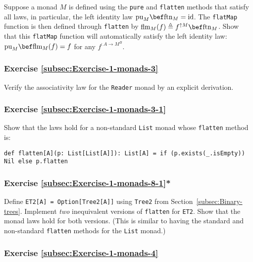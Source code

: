 Suppose a monad $M$ is defined using the \lstinline!pure! and \lstinline!flatten!
methods that satisfy all laws, in particular, the left identity law
$\text{pu}_{M}\bef\text{ftn}_{M}=\text{id}$. The \lstinline!flatMap!
function is then defined through \lstinline!flatten! by $\text{flm}_{M}(f)\triangleq f^{\uparrow M}\bef\text{ftn}_{M}$.
Show that this \lstinline!flatMap! function will automatically satisfy
the left identity law: $\text{pu}_{M}\bef\text{flm}_{M}(f)=f$ for
any $f^{:A\rightarrow M^{B}}$.

\subsubsection{Exercise \label{subsec:Exercise-1-monads-3}\ref{subsec:Exercise-1-monads-3}}

Verify the associativity law for the \lstinline!Reader! monad by
an explicit derivation.

\subsubsection{Exercise \label{subsec:Exercise-1-monads-3-1}\ref{subsec:Exercise-1-monads-3-1}}

Show that the laws hold for a non-standard \lstinline!List! monad
whose \lstinline!flatten! method is:
\begin{lstlisting}
def flatten[A](p: List[List[A]]): List[A] = if (p.exists(_.isEmpty)) Nil else p.flatten
\end{lstlisting}


\subsubsection{Exercise \label{subsec:Exercise-1-monads-8-1}\ref{subsec:Exercise-1-monads-8-1}{*}}

Define \lstinline!ET2[A] = Option[Tree2[A]]! using \lstinline!Tree2!
from Section~\ref{subsec:Binary-trees}. Implement \emph{two} inequivalent
versions of \lstinline!flatten! for \lstinline!ET2!. Show that the
monad laws hold for both versions. (This is similar to having the
standard and non-standard \lstinline!flatten! methods for the \lstinline!List!
monad.)

\subsubsection{Exercise \label{subsec:Exercise-1-monads-4}\ref{subsec:Exercise-1-monads-4}}

